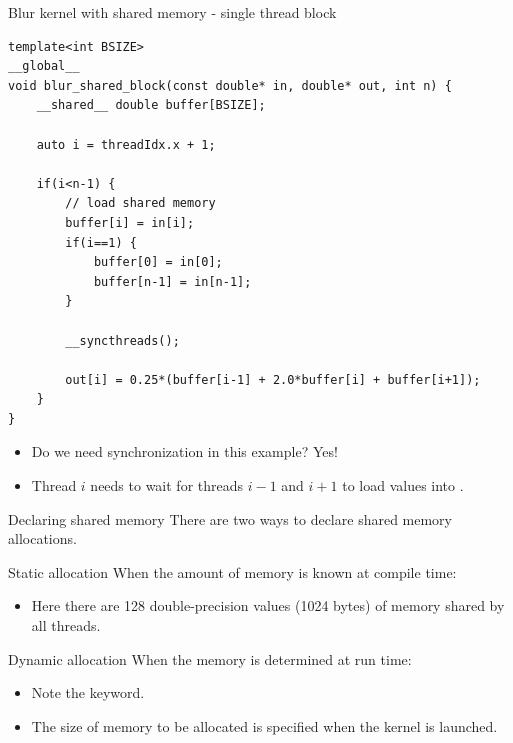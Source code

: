 \documentclass[aspectratio=43]{beamer}
\begin{document}
\begin{frame}[fragile]{}
    \begin{code}{Blur kernel with shared memory - single thread block}
        \begin{lstlisting}[style=boxcudatiny]
template<int BSIZE>
__global__
void blur_shared_block(const double* in, double* out, int n) {
    __shared__ double buffer[BSIZE];

    auto i = threadIdx.x + 1;

    if(i<n-1) {
        // load shared memory
        buffer[i] = in[i];
        if(i==1) {
            buffer[0] = in[0];
            buffer[n-1] = in[n-1];
        }

        __syncthreads();

        out[i] = 0.25*(buffer[i-1] + 2.0*buffer[i] + buffer[i+1]);
    }
}
        \end{lstlisting}
    \end{code}
    \begin{itemize}
        \item Do we need synchronization in this example? Yes!
        \item Thread $i$ needs to wait for threads $i-1$ and $i+1$ to load values into .
    \end{itemize}

\end{frame}

\begin{frame}[fragile]{Declaring shared memory}
    There are two ways to declare shared memory allocations.

    \begin{info}{Static allocation}
        When the amount of memory is known at compile time:

        \centering {}
        \begin{itemize}
            \item Here there are 128 double-precision values (1024 bytes) of memory shared by all threads.
        \end{itemize}
    \end{info}

    \begin{info}{Dynamic allocation}
        When the memory is determined at run time:

        \centering {}
        \begin{itemize}
            \item Note the  keyword.
            \item The size of memory to be allocated is specified when the kernel is launched.
        \end{itemize}
    \end{info}

\end{frame}
\end{document}
